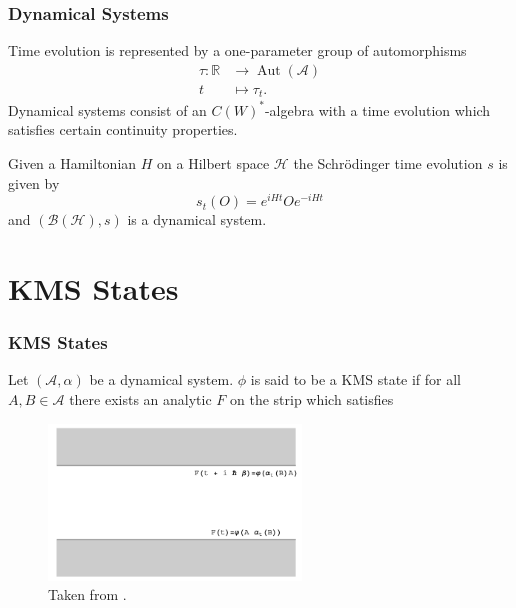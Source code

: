 \documentclass{beamer}
\DeclareMathOperator{\Aut}{Aut}
\begin{document}
\begin{frame}
	\frametitle{Dynamical Systems}
	Time evolution is represented by a one-parameter group of automorphisms
	\begin{align*}
		\tau:\mathbb{R}&\rightarrow\Aut(\mathcal{A}) \\
		t&\mapsto\tau_t.
	\end{align*}
	Dynamical systems consist of an $C(W)^*$-algebra with a time evolution which satisfies certain continuity properties.
	\begin{example}
	Given a Hamiltonian $H$ on a Hilbert space $\mathcal{H}$ the Schrödinger time evolution $s$ is given by
	\begin{equation}
	s_t(O)=e^{iHt}O e^{-iHt}
	\end{equation}
	and $(\mathcal{B}(\mathcal{H}),s)$ is a dynamical system.
	\end{example}
\end{frame}

\section{KMS States}

\begin{frame}
	\frametitle{KMS States}
	\begin{definition}
	Let $(\mathcal{A},\alpha)$ be a dynamical system. $\phi$ is said to be a KMS state if for all $A,B\in\mathcal{A}$ there exists an analytic $F$ on the strip which satisfies
	\begin{figure}
		\includegraphics[width=0.6\textwidth]{images/kms.png}
		\caption{Taken from \cite{Connes1994}.}
	\end{figure}
	\end{definition}
\end{frame}
\end{document}
